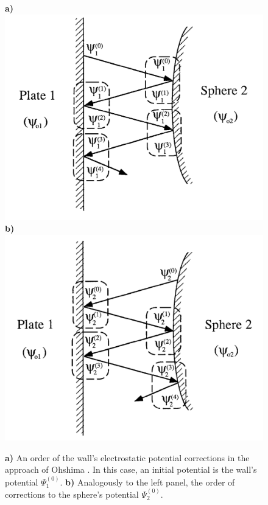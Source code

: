 \documentclass{master_thesis}
\begin{document}
\begin{figure}
    \begin{minipage}{\linewidth}
         \centering
         \textbf{a)}
         \includegraphics[width=0.45\linewidth,valign=t]{figures/ohshima_corrections_wall.png}
         \textbf{b)}
         \includegraphics[width=0.45\linewidth,valign=t]{figures/ohshima_corrections_sphere.png}
    \end{minipage}
    \caption{
    \textbf{a)} An order of the wall's electrostatic potential corrections in the approach of Ohshima \cite{ohshima1998}. In this case, an initial potential is the wall's potential $\Psi_1^{(0)}$.  \textbf{b)} Analogously to the left panel, the order of corrections to the sphere's potential $\Psi_2^{(0)}$.
    }
\label{fig:ohshima_corrections}
\end{figure}
\end{document}
